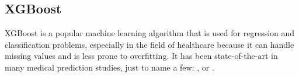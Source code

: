 \documentclass[../main.tex]{subfiles}
\begin{document}
\subsection{XGBoost}

XGBoost is a popular machine learning algorithm that is used for regression and classification problems, especially in the field of healthcare because it can handle missing values and is less prone to overfitting.
It has been state-of-the-art in many medical prediction studies, just to name a few: ,  or .
\end{document}
